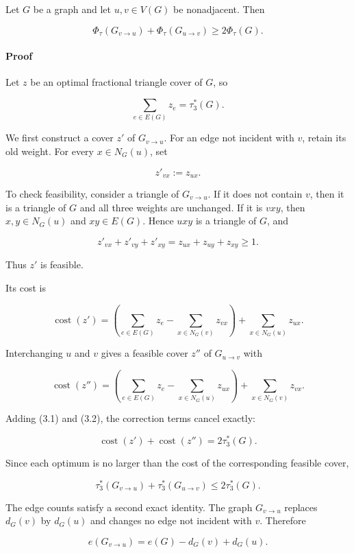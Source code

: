 \documentclass[
  american,
  11pt,
  a4paper,
]{article}
\begin{document}
Let \(G\) be a graph and let \(u,v\in V(G)\) be nonadjacent. Then

\[
\boxed{
\Phi_\tau(G_{v\to u})
+
\Phi_\tau(G_{u\to v})
\ge
2\Phi_\tau(G).
}
\]

\paragraph{Proof}\label{proof-1}

Let \(z\) be an optimal fractional triangle cover of \(G\), so

\[
\sum_{e\in E(G)}z_e=\tau_3^*(G).
\]

We first construct a cover \(z'\) of \(G_{v\to u}\). For an edge not incident with \(v\), retain its old weight. For every \(x\in N_G(u)\), set

\[
z'_{vx}:=z_{ux}.
\]

To check feasibility, consider a triangle of \(G_{v\to u}\). If it does not contain \(v\), then it is a triangle of \(G\) and all three weights are unchanged. If it is \(vxy\), then \(x,y\in N_G(u)\) and \(xy\in E(G)\). Hence \(uxy\) is a triangle of \(G\), and

\[
z'_{vx}+z'_{vy}+z'_{xy}
=
z_{ux}+z_{uy}+z_{xy}
\ge1.
\]

Thus \(z'\) is feasible.

Its cost is

\[
\operatorname{cost}(z')
=
\left(
\sum_{e\in E(G)}z_e
-
\sum_{x\in N_G(v)}z_{vx}
\right)
+
\sum_{x\in N_G(u)}z_{ux}.
\tag{3.1}
\]

Interchanging \(u\) and \(v\) gives a feasible cover \(z''\) of \(G_{u\to v}\) with

\[
\operatorname{cost}(z'')
=
\left(
\sum_{e\in E(G)}z_e
-
\sum_{x\in N_G(u)}z_{ux}
\right)
+
\sum_{x\in N_G(v)}z_{vx}.
\tag{3.2}
\]

Adding (3.1) and (3.2), the correction terms cancel exactly:

\[
\operatorname{cost}(z')
+
\operatorname{cost}(z'')
=
2\tau_3^*(G).
\]

Since each optimum is no larger than the cost of the corresponding feasible cover,

\[
\tau_3^*(G_{v\to u})
+
\tau_3^*(G_{u\to v})
\le
2\tau_3^*(G).
\tag{3.3}
\]

The edge counts satisfy a second exact identity. The graph \(G_{v\to u}\) replaces \(d_G(v)\) by \(d_G(u)\) and changes no edge not incident with \(v\). Therefore

\[
e(G_{v\to u})
=
e(G)-d_G(v)+d_G(u).
\]
\end{document}
